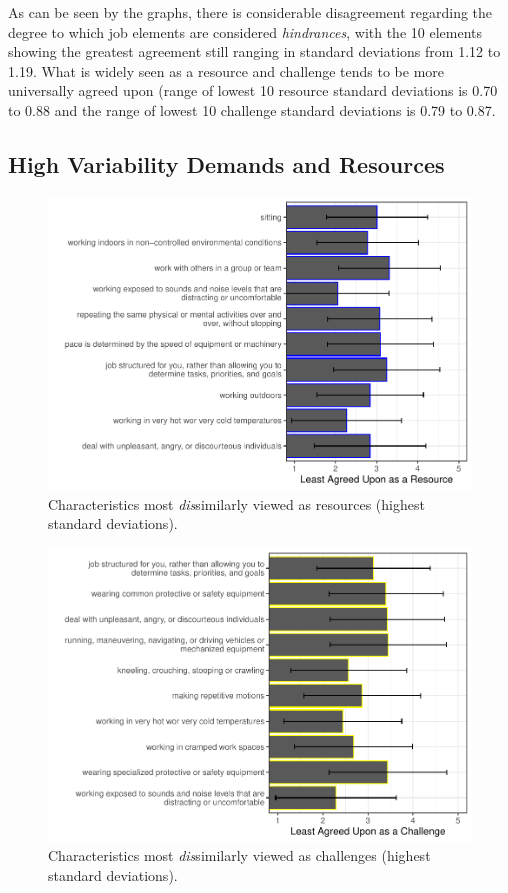 \documentclass[
  man]{apa6}
\begin{document}
As can be seen by the graphs, there is considerable disagreement regarding the degree to which job elements are considered \emph{hindrances}, with the 10 elements showing the greatest agreement still ranging in standard deviations from 1.12 to 1.19. What is widely seen as a resource and challenge tends to be more universally agreed upon (range of lowest 10 resource standard deviations is 0.70 to 0.88 and the range of lowest 10 challenge standard deviations is 0.79 to 0.87.

\hypertarget{high-variability-demands-and-resources}{%
\subsection{High Variability Demands and Resources}\label{high-variability-demands-and-resources}}

\begin{figure}
\centering
\includegraphics{Submission_files/figure-latex/resourcesdisagree-1.pdf}
\caption{\label{fig:resourcesdisagree}Characteristics most \emph{dis}similarly viewed as resources (highest standard deviations).}
\end{figure}

\begin{figure}
\centering
\includegraphics{Submission_files/figure-latex/challengesdisagree-1.pdf}
\caption{\label{fig:challengesdisagree}Characteristics most \emph{dis}similarly viewed as challenges (highest standard deviations).}
\end{figure}
\end{document}
